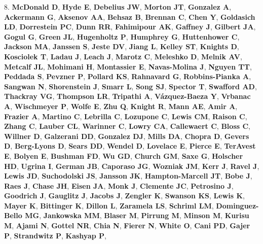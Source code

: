 \documentclass[]{article}
\begin{document}
8. \textbf{McDonald D}, \textbf{Hyde E}, \textbf{Debelius JW},
\textbf{Morton JT}, \textbf{Gonzalez A}, \textbf{Ackermann G},
\textbf{Aksenov AA}, \textbf{Behsaz B}, \textbf{Brennan C}, \textbf{Chen
Y}, \textbf{Goldasich LD}, \textbf{Dorrestein PC}, \textbf{Dunn RR},
\textbf{Fahimipour AK}, \textbf{Gaffney J}, \textbf{Gilbert JA},
\textbf{Gogul G}, \textbf{Green JL}, \textbf{Hugenholtz P},
\textbf{Humphrey G}, \textbf{Huttenhower C}, \textbf{Jackson MA},
\textbf{Janssen S}, \textbf{Jeste DV}, \textbf{Jiang L}, \textbf{Kelley
ST}, \textbf{Knights D}, \textbf{Kosciolek T}, \textbf{Ladau J},
\textbf{Leach J}, \textbf{Marotz C}, \textbf{Meleshko D}, \textbf{Melnik
AV}, \textbf{Metcalf JL}, \textbf{Mohimani H}, \textbf{Montassier E},
\textbf{Navas-Molina J}, \textbf{Nguyen TT}, \textbf{Peddada S},
\textbf{Pevzner P}, \textbf{Pollard KS}, \textbf{Rahnavard G},
\textbf{Robbins-Pianka A}, \textbf{Sangwan N}, \textbf{Shorenstein J},
\textbf{Smarr L}, \textbf{Song SJ}, \textbf{Spector T}, \textbf{Swafford
AD}, \textbf{Thackray VG}, \textbf{Thompson LR}, \textbf{Tripathi A},
\textbf{V{á}zquez-Baeza Y}, \textbf{Vrbanac A}, \textbf{Wischmeyer P},
\textbf{Wolfe E}, \textbf{Zhu Q}, \textbf{Knight R}, \textbf{Mann AE},
\textbf{Amir A}, \textbf{Frazier A}, \textbf{Martino C},
\textbf{Lebrilla C}, \textbf{Lozupone C}, \textbf{Lewis CM},
\textbf{Raison C}, \textbf{Zhang C}, \textbf{Lauber CL},
\textbf{Warinner C}, \textbf{Lowry CA}, \textbf{Callewaert C},
\textbf{Bloss C}, \textbf{Willner D}, \textbf{Galzerani DD},
\textbf{Gonzalez DJ}, \textbf{Mills DA}, \textbf{Chopra D},
\textbf{Gevers D}, \textbf{Berg-Lyons D}, \textbf{Sears DD},
\textbf{Wendel D}, \textbf{Lovelace E}, \textbf{Pierce E},
\textbf{TerAvest E}, \textbf{Bolyen E}, \textbf{Bushman FD}, \textbf{Wu
GD}, \textbf{Church GM}, \textbf{Saxe G}, \textbf{Holscher HD},
\textbf{Ugrina I}, \textbf{German JB}, \textbf{Caporaso JG},
\textbf{Wozniak JM}, \textbf{Kerr J}, \textbf{Ravel J}, \textbf{Lewis
JD}, \textbf{Suchodolski JS}, \textbf{Jansson JK},
\textbf{Hampton-Marcell JT}, \textbf{Bobe J}, \textbf{Raes J},
\textbf{Chase JH}, \textbf{Eisen JA}, \textbf{Monk J}, \textbf{Clemente
JC}, \textbf{Petrosino J}, \textbf{Goodrich J}, \textbf{Gauglitz J},
\textbf{Jacobs J}, \textbf{Zengler K}, \textbf{Swanson KS},
\textbf{Lewis K}, \textbf{Mayer K}, \textbf{Bittinger K}, \textbf{Dillon
L}, \textbf{Zaramela LS}, \textbf{Schriml LM}, \textbf{Dominguez-Bello
MG}, \textbf{Jankowska MM}, \textbf{Blaser M}, \textbf{Pirrung M},
\textbf{Minson M}, \textbf{Kurisu M}, \textbf{Ajami N}, \textbf{Gottel
NR}, \textbf{Chia N}, \textbf{Fierer N}, \textbf{White O}, \textbf{Cani
PD}, \textbf{Gajer P}, \textbf{Strandwitz P}, \textbf{Kashyap P},
\end{document}
